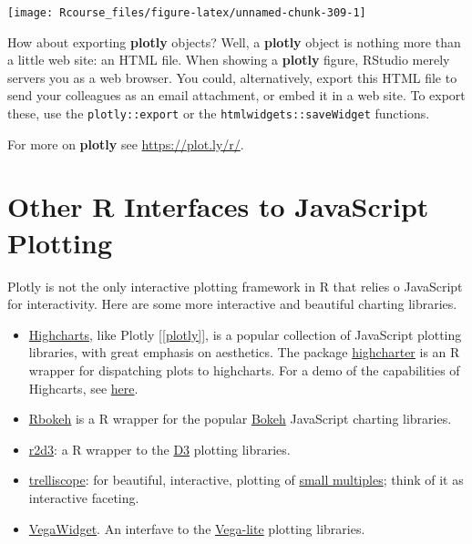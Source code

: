 \documentclass[]{book}
\theoremstyle{definition}
\theoremstyle{definition}
\theoremstyle{definition}
\theoremstyle{remark}
\begin{document}
\texttt{[image: Rcourse\_files/figure-latex/unnamed-chunk-309-1]}

How about exporting \textbf{plotly} objects? Well, a \textbf{plotly}
object is nothing more than a little web site: an HTML file. When
showing a \textbf{plotly} figure, RStudio merely servers you as a web
browser. You could, alternatively, export this HTML file to send your
colleagues as an email attachment, or embed it in a web site. To export
these, use the \texttt{plotly::export} or the
\texttt{htmlwidgets::saveWidget} functions.

For more on \textbf{plotly} see \url{https://plot.ly/r/}.

\section{Other R Interfaces to JavaScript
Plotting}\label{other-r-interfaces-to-javascript-plotting}

Plotly is not the only interactive plotting framework in R that relies o
JavaScript for interactivity. Here are some more interactive and
beautiful charting libraries.

\begin{itemize}
\item
  \href{https://www.highcharts.com/}{Highcharts}, like Plotly
  {[}\ref{plotly}{]}, is a popular collection of JavaScript plotting
  libraries, with great emphasis on aesthetics. The package
  \href{https://cran.r-project.org/package=highcharter}{highcharter} is
  an R wrapper for dispatching plots to highcharts. For a demo of the
  capabilities of Highcarts, see
  \href{https://www.highcharts.com/demo}{here}.
\item
  \href{http://hafen.github.io/rbokeh/}{Rbokeh} is a R wrapper for the
  popular \href{https://bokeh.pydata.org/en/latest/}{Bokeh} JavaScript
  charting libraries.
\item
  \href{https://rstudio.github.io/r2d3/}{r2d3}: a R wrapper to the
  \href{https://d3js.org/}{D3} plotting libraries.
\item
  \href{https://hafen.github.io/trelliscopejs/\#trelliscope}{trelliscope}:
  for beautiful, interactive, plotting of
  \href{https://www.juiceanalytics.com/writing/better-know-visualization-small-multiples}{small
  multiples}; think of it as interactive faceting.
\item
  \href{https://vegawidget.github.io/vegawidget/}{VegaWidget}. An
  interfave to the \href{https://vega.github.io/vega-lite/}{Vega-lite}
  plotting libraries.
\end{itemize}
\end{document}
